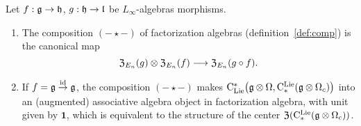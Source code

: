 \documentclass[11pt]{amsart}
\numberwithin{equation}{section}
\begin{document}
\begin{thm}\label{T:compcentralizer}
 Let $f: \mathfrak g \to \mathfrak h$, $g: \mathfrak h \to \mathfrak l$ be  $L_\infty$-algebras morphisms.
\begin{enumerate} \item 
 The composition $(-\star-)$ of factorization algebras (definition~\ref{def:comp}) 
 is the canonical map 
\[{\frak Z}_{E_n}(g) \otimes {\frak Z}_{E_n}(f) \longrightarrow {\frak Z}_{E_n}(g\circ f).\] 
\item If $f= \mathfrak g \stackrel{{\rm id}}\to \mathfrak g$,  the composition $(-\star-)$ makes 
${\rm C}_{\rm Lie}^*\big(\mathfrak g \otimes \Omega, {\rm C}^{\rm Lie}_*(\mathfrak g \otimes \Omega_c) \big)$ into an 
(augmented) associative algebra object in factorization algebra, with unit given by $\mathbf{1}$, 
which is equivalent to the structure of the center ${\frak Z} ({\rm C}^{\rm Lie}_*(\mathfrak g \otimes \Omega_c))$. 
\end{enumerate}
\end{thm}
\end{document}
